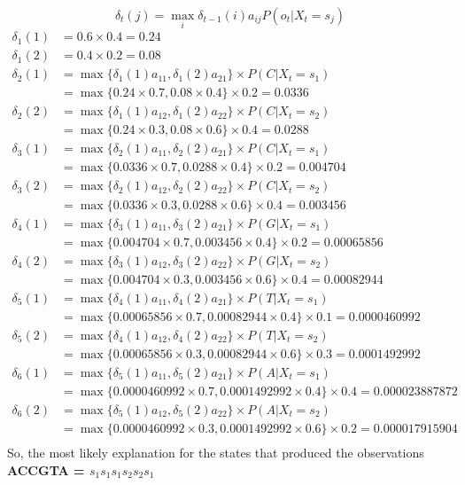 \documentclass[a4paper,doc,notimes]{article}
\begin{document}
\begin{equation}
	\delta_t(j) = \max_i \delta_{t-1} (i) a_{ij} P(o_t|X_t=s_j) 
\end{equation}
\begin{align*}
\delta_1(1) & = 0.6 \times 0.4 = 0.24  \\
\delta_1(2) &  =  0.4 \times 0.2  = 0.08   \\
\delta_2(1) & =  \max \{ \delta_1(1) a_{11},  \delta_1(2) a_{21}  \} \times P(C|X_t=s_1) \\
               & =\max \{0.24 \times 0.7 , 0.08 \times 0.4 \} \times 0.2 = 0.0336 \\
\delta_2(2) & = \max \{ \delta_1(1) a_{12},  \delta_1(2) a_{22}  \} \times P(C|X_t=s_2) \\
			& =\max \{0.24 \times 0.3 , 0.08 \times 0.6 \} \times 0.4 = 0.0288 \\
\delta_3(1) & =  \max \{ \delta_2(1) a_{11},  \delta_2(2) a_{21}  \} \times P(C|X_t=s_1) \\
& =\max \{0.0336 \times 0.7 , 0.0288  \times 0.4 \} \times 0.2 = 0.004704 \\
\delta_3(2) & =  \max \{ \delta_2(1) a_{12},  \delta_2(2) a_{22}  \} \times P(C|X_t=s_2) \\
& =\max \{0.0336 \times 0.3 , 0.0288  \times 0.6 \} \times 0.4 = 0.003456 \\
\delta_4(1) & =  \max \{ \delta_3(1) a_{11},  \delta_3(2) a_{21}  \} \times P(G|X_t=s_1) \\
& =\max \{0.004704 \times 0.7 , 0.003456  \times 0.4 \} \times 0.2 = 0.00065856 \\
\delta_4(2) & =  \max \{ \delta_3(1) a_{12},  \delta_3(2) a_{22}  \} \times P(G|X_t=s_2) \\
& =\max \{0.004704 \times 0.3 , 0.003456  \times 0.6 \} \times 0.4 =0.00082944 \\
\delta_5(1) & =  \max \{ \delta_4(1) a_{11},  \delta_4(2) a_{21}  \} \times P(T|X_t=s_1) \\
& =\max \{0.00065856 \times 0.7 , 0.00082944  \times 0.4 \} \times 0.1 = 0.0000460992 \\
\delta_5(2) & =  \max \{ \delta_4(1) a_{12},  \delta_4(2) a_{22}  \} \times P(T|X_t=s_2) \\
& =\max \{0.00065856 \times 0.3 ,0.00082944  \times 0.6 \} \times 0.3 =0.0001492992 \\
\delta_6(1) & =  \max \{ \delta_5(1) a_{11},  \delta_5(2) a_{21}  \} \times P(A|X_t=s_1) \\
& =\max \{0.0000460992 \times 0.7 , 0.0001492992 \times 0.4 \} \times 0.4 =0.000023887872 \\
\delta_6(2) & =  \max \{ \delta_5(1) a_{12},  \delta_5(2) a_{22}  \} \times P(A|X_t=s_2) \\
& =\max \{0.0000460992 \times 0.3, 0.0001492992 \times 0.6 \} \times 0.2 =0.000017915904 \\
\end{align*}
So, the most likely explanation for the states that produced the observations \textbf{ACCGTA = $s_1s_1s_1s_2s_2s_1$}  
\end{document}
